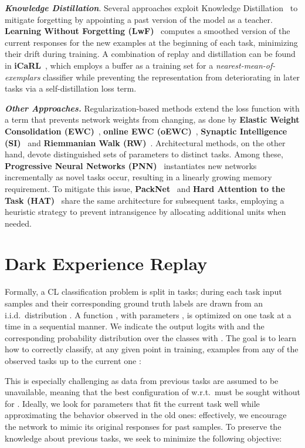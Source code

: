 \documentclass{article}
\begin{document}
\textit{\textbf{Knowledge Distillation}}. Several approaches exploit Knowledge Distillation~\cite{hinton2015distilling} to mitigate forgetting by appointing a past version of the model as a teacher. \textbf{Learning Without Forgetting (LwF)}~\cite{li2017learning} computes a smoothed version of the current responses for the new examples at the beginning of each task, minimizing their drift during training. A combination of replay and distillation can be found in \textbf{iCaRL}~\cite{rebuffi2017icarl}, which employs a buffer as a training set for a \textit{nearest-mean-of-exemplars} classifier while preventing the representation from deteriorating in later tasks via a self-distillation loss term. 

\textit{\textbf{Other Approaches.}} Regularization-based methods extend the loss function with a term that prevents network weights from changing, as done by \textbf{Elastic Weight Consolidation (EWC)}~\cite{kirkpatrick2017overcoming}, \textbf{online EWC (oEWC)}~\cite{schwarz2018progress}, \textbf{Synaptic Intelligence (SI)}~\cite{zenke2017continual} and \textbf{Riemmanian Walk (RW)}~\cite{chaudhry2018riemannian}. Architectural methods, on the other hand, devote distinguished sets of parameters to distinct tasks. Among these, \textbf{Progressive Neural Networks (PNN)}~\cite{rusu2016progressive} instantiates new networks incrementally as novel tasks occur, resulting in a linearly growing memory requirement. To mitigate this issue, \textbf{PackNet}~\cite{mallya2018packnet} and \textbf{Hard Attention to the Task (HAT)}~\cite{serra2018overcoming} share the same architecture for subsequent tasks, employing a heuristic strategy to prevent intransigence by allocating additional units when needed. \section{Dark Experience Replay}
\label{sec:model}
Formally, a CL classification problem is split in  tasks; during each task  input samples  and their corresponding ground truth labels  are drawn from an i.i.d.\ distribution . A function , with parameters , is optimized on one task at a time in a sequential manner. We indicate the output logits with  and the corresponding probability distribution over the classes with . The goal is to learn how to correctly classify, at any given point in training, examples from any of the observed tasks up to the current one :

This is especially challenging as data from previous tasks are assumed to be unavailable, meaning that the best configuration of  w.r.t.\  must be sought without  for . Ideally, we look for parameters that fit the current task well while approximating the behavior observed in the old ones: effectively, we encourage the network to mimic its original responses for past samples. To preserve the knowledge about previous tasks, we seek to minimize the following objective:
\end{document}
